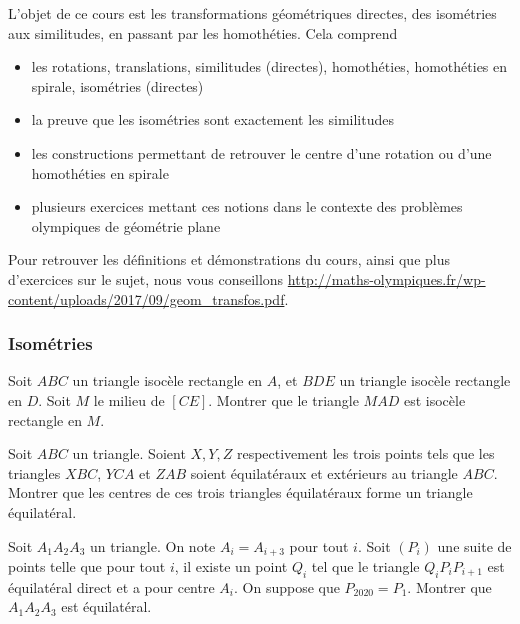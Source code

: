 
L'objet de ce cours est les transformations géométriques directes, des isométries aux similitudes, en passant par les homothéties. Cela comprend
\begin{itemize}
\item les rotations, translations, similitudes (directes), homothéties, homothéties en spirale, isométries (directes)
\item la preuve que les isométries sont exactement les similitudes
\item les constructions permettant de retrouver le centre d'une rotation ou d'une homothéties en spirale
\item plusieurs exercices mettant ces notions dans le contexte des problèmes olympiques de géométrie plane
\end{itemize}

Pour retrouver les définitions et démonstrations du cours, ainsi que plus d'exercices sur le sujet, nous vous conseillons \href{le cours de la POFM sur le sujet}{http://maths-olympiques.fr/wp-content/uploads/2017/09/geom\_transfos.pdf}.


\subsubsection{Isométries}


\begin{exo}
Soit $ABC$ un triangle isocèle rectangle en $A$, et $BDE$ un triangle isocèle rectangle en $D$. Soit $M$ le milieu de $[CE]$. Montrer que le triangle $MAD$ est isocèle rectangle en $M$.
\end{exo}


\begin{exo}
Soit $ABC$ un triangle. Soient $X,Y,Z$ respectivement les trois points tels que les triangles $XBC$, $YCA$ et $ZAB$ soient équilatéraux et extérieurs au triangle $ABC$. Montrer que les centres de ces trois triangles équilatéraux forme un triangle équilatéral.
\end{exo}


\begin{exo}
Soit $A_1A_2A_3$ un triangle. On note $A_i = A_{i+3}$ pour tout $i$. Soit $(P_i)$ une suite de points
telle que pour tout $i$, il existe un point $Q_i$ tel que le triangle $Q_iP_iP_{i+1}$ est équilatéral direct et a pour centre $A_i$.
On suppose que $P_{2020} = P_1$. Montrer que $A_1A_2A_3$ est équilatéral.
\end{exo}


